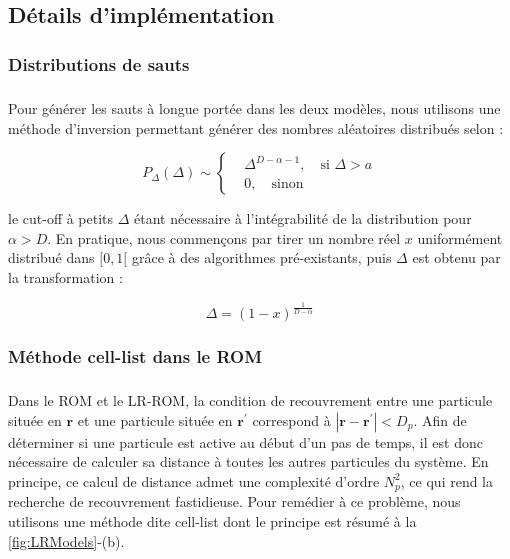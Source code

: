 \subsection{Détails d'implémentation}

\label{sec:DetImpl}

\subsubsection{Distributions de sauts}

\subparagraph{}Pour générer les sauts à longue portée dans les deux modèles, nous utilisons une méthode d'inversion \cite{devroye_general_1986} permettant générer des nombres aléatoires distribués selon :

\begin{equation}
	P_\Delta(\Delta) \sim \left\{
	\begin{aligned}
	& \Delta^{D-\alpha-1},\quad \text{si } \Delta > a\\
	& 0, \quad \text{sinon}
	\end{aligned}\right.
\end{equation}

\noindent le cut-off à petits $\Delta$ étant nécessaire à l'intégrabilité de la distribution pour $\alpha > D$. En pratique, nous commençons par tirer un nombre réel $x$ uniformément distribué dans $[0,1[$ grâce à des algorithmes pré-existants, puis $\Delta$ est obtenu par la transformation :

\begin{equation}
	\Delta = (1-x)^\frac{1}{D-\alpha}
\end{equation}

\subsubsection{Méthode cell-list dans le ROM}

\subparagraph{}Dans le ROM et le LR-ROM, la condition de recouvrement entre une particule située en $\mathbf{r}$ et une particule située en $\mathbf{r}^\prime$ correspond à $|\mathbf{r}-\mathbf{r}^\prime|<D_p$. Afin de déterminer si une particule est active au début d'un pas de temps, il est donc nécessaire de calculer sa distance à toutes les autres particules du système. En principe, ce calcul de distance admet une complexité d'ordre $N_p^2$, ce qui rend la recherche de recouvrement fastidieuse. Pour remédier à ce problème, nous utilisons une méthode dite cell-list \cite{allen_computer_2017} dont le principe est résumé à la \autoref{fig:LRModels}-(b).

